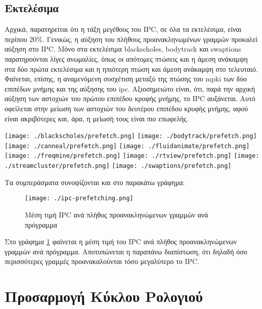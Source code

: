 \documentclass{article}
\newcommand{\eng}[1]{\foreignlanguage{english}{#1}}
\begin{document}
\subsection{Εκτελέσιμα}

Αρχικά, παρατηρείται ότι η τάξη μεγέθους του \eng{IPC}, σε όλα τα εκτελέσιμα, είναι περίπου 20\%. Γενικώς, η αύξηση του πλήθους προανακληνωμένων γραμμών προκαλεί αύξηση στο \eng{IPC}. Μόνο στα εκτελέσιμα \eng{blackscholes, bodytrack} και \eng{swaptions} παρατηρούνται λίγες ανωμαλίες, όπως οι απότομες πτώσεις και η άμεση ανάκαμψη στα δύο πρώτα εκτελέσιμα  και η ηπιότερη πτώση και άμεση ανάκαμψη στο τελευταιό. Φαίνεται, επίσης, η αναμενόμενη συσχέτιση μεταξύ της πτώσης του \eng{mpki} των δύο επιπέδων μνήμης και της αύξησης του \eng{ipc}. Αξιοσημειώτο είναι, ότι, παρά την αρχική αύξηση των αστοχιών του πρώτου επιπέδου κρυφής μνήμης, το \eng{IPC} αυξάνεται. Αυτό οφείλεται στην μείωση των αστοχιών του δευτέρου επιπέδου κρυφής μνήμης, αφού είναι ακριβότερες και, άρα, η μείωσή τους είναι πιο επωφελής.

\graphicspath{{../parsec-3.0/parsec_workspace/outputs/exp4/}}
\begin{center}
    \texttt{[image: ./blackscholes/prefetch.png]} 
    \texttt{[image: ./bodytrack/prefetch.png]} 
    \texttt{[image: ./canneal/prefetch.png]} 
    \texttt{[image: ./fluidanimate/prefetch.png]} 
    \texttt{[image: ./freqmine/prefetch.png]} 
    \texttt{[image: ./rtview/prefetch.png]} 
    \texttt{[image: ./streamcluster/prefetch.png]} 
    \texttt{[image: ./swaptions/prefetch.png]} 
\end{center}
\FloatBarrier

Τα συμπεράσματα συνοψίζονται και στο παρακάτω γράφημα:

\begin{figure}[h]
    \texttt{[image: ./ipc-prefetching.png]}
    \caption{Μέση τιμή \eng{IPC} ανά πλήθος προανακληνώμενων γραμμών ανά πρόγραμμα}    
    \label{fig:exp4-avgs}
\end{figure}

Στο γράφημα \ref{fig:exp4-avgs} φαίνεται η μέση τιμή του \eng{IPC} ανά πλήθος προανακληνώμενων γραμμών ανά πρόγραμμα. Αποτυπώνεται η παραπάνω διαπίστωση, ότι δηλαδή όσο περισσότερες γραμμές προανακαλούνται τόσο μεγαλύτερο το \eng{IPC}.

\section{Προσαρμογή Κύκλου Ρολογιού}
\end{document}
